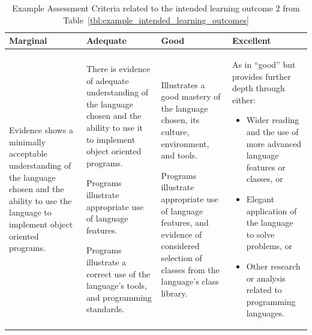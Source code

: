 \begin{table}[!t]
  \footnotesize
\renewcommand{\arraystretch}{1.3}
\caption{Example Assessment Criteria related to the intended learning outcome 2 from Table~\ref{tbl:example_intended_learning_outcomes}}
\label{tbl:example_assessment_criteria}
\centering
\begin{tabular}{|p{1.5in}|p{1.5in}|p{1.5in}|p{1.5in}|}
\hline
\textbf{Marginal} & \textbf{Adequate} & \textbf{Good} & \textbf{Excellent} \\
\hline
Evidence shows a minimally acceptable understanding of the language chosen and the ability to use the language to implement object oriented programs. 
&
There is evidence of adequate understanding of the language chosen and the ability to use it to implement object oriented programs.

Programs illustrate appropriate use of language features.

Programs illustrate a correct use of the language’s tools, and programming standards.
&
	Illustrates a good mastery of the language chosen, its culture, environment, and tools.

Programs illustrate appropriate use of language features, and evidence of considered selection of classes from the language’s class library.	
&
As in “good” but provides further depth through either:

\begin{itemize}
  \item Wider reading and the use of more advanced language features or classes, or
  \item Elegant application of the language to solve problems, or
  \item Other research or analysis related to programming languages.
\end{itemize}
\\
\hline
\end{tabular}
\end{table}

